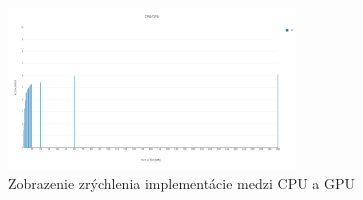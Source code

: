 \documentclass[conference]{IEEEtran}
\begin{document}
\begin{figure}[h!]
\centering
\includegraphics[width=3in]{img/acceleration}
\caption{Zobrazenie zrýchlenia implementácie medzi CPU a GPU}
\end{figure}






\ifCLASSOPTIONcaptionsoff
  \newpage
\fi
\end{document}
